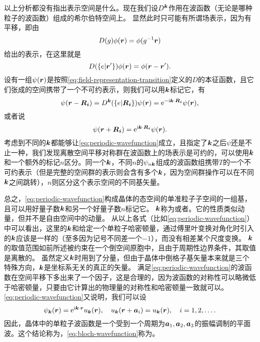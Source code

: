以上分析都没有指出表示空间是什么。现在我们设$D^{\vb*{k}}$作用在波函数（无论是哪种粒子的波函数）组成的希尔伯特空间上。
显然此时只可能有所谓场表示，因为有平移，即由
\[
    D(g) \phi(\vb*{r}) = \phi(g^{-1} \vb*{r})
\]
给出的表示，在这里就是
\begin{equation}
    D(\{e | \vb*{r}' \}) \phi(\vb*{r}) = \phi(\vb*{r} - \vb*{r}'). 
    \label{eq:field-representation-transition}
\end{equation}
设有一组$\psi(\vb*{r})$是按照\eqref{eq:field-representation-transition}定义的$D$的本征函数，且它们张成的空间携带了一个不可约表示，则我们可以用$\vb*{k}$标记它，有
\begin{equation}
    \psi(\vb*{r} - \vb*{R}_{\vb*{i}}) = D^{\vb*{k}}(\{e | \vb*{R}_{\vb*{i}} \}) \psi(\vb*{r}) = \mathrm{e}^{- \mathrm{i} \vb*{k} \cdot \vb*{R}_{\vb*{i}}} \psi(\vb*{r}),
\end{equation}
或者说
\begin{equation}
    \psi(\vb*{r}+\vb*{R}_{\vb*{i}}) = \mathrm{e}^{\mathrm{i} \vb*{k} \cdot \vb*{R}_{\vb*{i}}} \psi(\vb*{r}).
    \label{eq:periodic-wavefunction}
\end{equation}
考虑到不同的$\vb*{k}$都能够让\eqref{eq:periodic-wavefunction}成立，且指定了$\vb*{k}$之后$\psi$还是不止一种，我们发现离散空间平移对称群在波函数上的场表示是可约的，可以使用$\vb*{k}$和一个额外的标记$n$区分。同一个$\vb*{k}$，不同$n$的$\psi_{n \vb*{k}}$组成的波函数组携带$T$的一个不可约表示（但是完整的空间群的表示则会含有多个$\vb*{k}$，因为空间群操作可以在不同$\vb*{k}$之间跳转），$n$则区分这个表示空间的不同基矢量。

总之，\eqref{eq:periodic-wavefunction}构成晶体的态空间的单准粒子子空间的一组基，且可以用好量子数$\vb*{k}$和另一个好量子数$n$标记它。
$\vb*{k}$称为或者。它的性质类似动量，但并不是自由空间中的动量。
从以上各式（比如\eqref{eq:periodic-wavefunction}）中可以看出，这里的$\vb*{k}$和给定一个单粒子哈密顿量，通过傅里叶变换对角化时引入的$\vb*{k}$应该是一样的（至多因为记号不同差一个$-1$），而没有相差某个尺度变换。
$\vb*{k}$的取值范围如前所述被约束在一个倒空间原胞中，且由于周期性边界条件，其取值是离散的。
虽然定义$\vb*{k}$时用到了分量，但由于晶体中倒格子基矢量本来就是三个特殊方向，$\vb*{k}$是坐标系无关的真正的矢量。
满足\eqref{eq:periodic-wavefunction}的波函数在空间平移下多出来了一个因子，这是合理的，因为波函数的对称性可以略微低于哈密顿量，只要由它计算出的物理量的对称性和哈密顿量一致就可以。
\eqref{eq:periodic-wavefunction}又说明，我们可以设
\begin{equation}
    \psi_{\vb*{k}}(\vb*{r}) = \mathrm{e}^{\mathrm{i} \vb*{k} \cdot \vb*{r}} u_{\vb*{k}}(\vb*{r}), \quad u_{\vb*{k}}(\vb*{r}+\vb*{a}_i) = u_{\vb*{k}}(\vb*{r}), \quad i = 1, 2, \ldots.
    \label{eq:bloch-wavefunction}
\end{equation}
因此，晶体中的单粒子波函数是一个受到一个周期为$\vb*{a}_1,\vb*{a}_2, \vb*{a}_3$的振幅调制的平面波。这个结论称为，\eqref{eq:bloch-wavefunction}称为。



